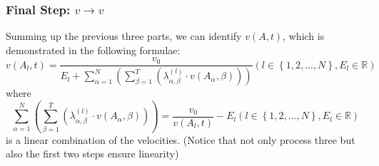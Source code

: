 \documentclass{article}
\theoremstyle{definition}
\theoremstyle{remark}
\numberwithin{equation}{section}
\begin{document}
	\subsubsection{Final Step: \(v\to v\)}
	Summing up the previous three parts, we can identify $v(A,t)$, which is demonstrated in the following formulae:
	$$v\left( A_l,t \right) =\frac{v_0}{E_l+\sum\limits_{\alpha =1}^N{\left( \sum\limits_{\beta =1}^T{\left( \lambda _{\alpha ,\beta}^{\left( l \right)}\cdot v\left( A_{\alpha},\beta \right) \right)} \right)}}\left( l\in \left\{ 1,2,...,N \right\} ,E_l\in \mathbb{R} \right)$$
	where
	$$\sum_{\alpha =1}^N{\left( \sum_{\beta =1}^T{\left( \lambda _{\alpha ,\beta}^{\left( l \right)}\cdot v\left( A_{\alpha},\beta \right) \right)} \right)}=\frac{v_0}{v\left( A_l,t \right)}-E_l\left( l\in \left\{ 1,2,...,N \right\} ,E_l\in \mathbb{R} \right)$$
	is a linear combination of the velocities. (Notice that not only process three but also the first two steps ensure linearity)
\end{document}
